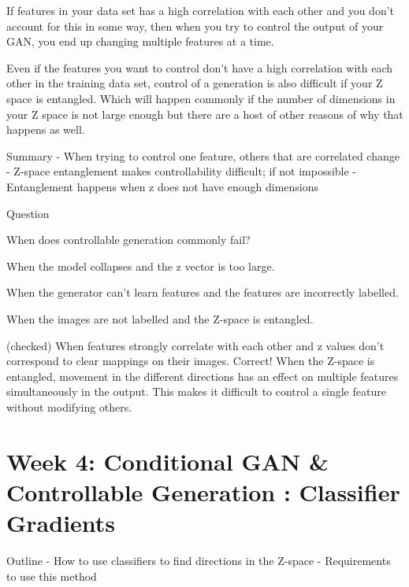 \documentclass[11pt, onecolumn]{article}
\begin{document}
If features in your data set has a high correlation with each other and you don't account for this in some way,
then when you try to control the output of your GAN, you end up changing multiple features at a time.

Even if the features you want to control don't have
a high correlation with each
other in the training data set,
control of a generation is also
difficult if your Z space is entangled.
Which will happen commonly if
the number of dimensions in your Z space is not
large enough but there are a host
of other reasons of why that happens as well. 

Summary
- When trying to control one feature, others that are correlated change
- Z-space entanglement makes controllability difficult; if not impossible
- Entanglement happens when z does not have enough dimensions 


Question

When does controllable generation commonly fail?

When the model collapses and the z vector is too large.

When the generator can’t learn features and the features are incorrectly labelled.

When the images are not labelled and the Z-space is entangled.

(checked) When features strongly correlate with each other and z values don’t correspond to clear mappings on their images.
Correct! When the Z-space is entangled, movement in the different directions has an effect on multiple features simultaneously in the output. This makes it difficult to control a single feature without modifying others.


\section{Week 4: Conditional GAN \& Controllable Generation : Classifier Gradients}

Outline
- How to use classifiers to find directions in the Z-space
- Requirements to use this method
\end{document}
